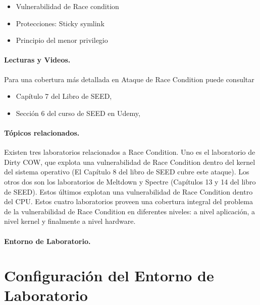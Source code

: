 \begin{itemize}[noitemsep]
\item Vulnerabilidad de Race condition
\item Protecciones: Sticky symlink
\item Principio del menor privilegio
\end{itemize}




\paragraph{Lecturas y Videos.}
Para una cobertura más detallada en Ataque de Race Condition puede consultar

\begin{itemize}
\item Capítulo 7 del Libro de SEED, \seedbook
\item Sección 6 del curso de SEED en Udemy, \seedcsvideo
\end{itemize}


\paragraph{Tópicos relacionados.}
Existen tres laboratorios relacionados a Race Condition. Uno es el laboratorio de Dirty COW, que explota una vulnerabilidad de Race Condition dentro del kernel del sistema operativo (El Capítulo 8 del libro de SEED cubre este ataque). Los otros dos son los laboratorios de Meltdown y Spectre (Capítulos 13 y 14 del libro de SEED). Estos últimos explotan una vulnerabilidad de Race Condition dentro del CPU. Estos cuatro laboratorios proveen una cobertura integral del problema de la vulnerabilidad de Race Condition en diferentes niveles: a nivel aplicación, a nivel kernel y finalmente a nivel hardware.


\paragraph{Entorno de Laboratorio.} \seedenvironmentC


\section{Configuración del Entorno de Laboratorio}

